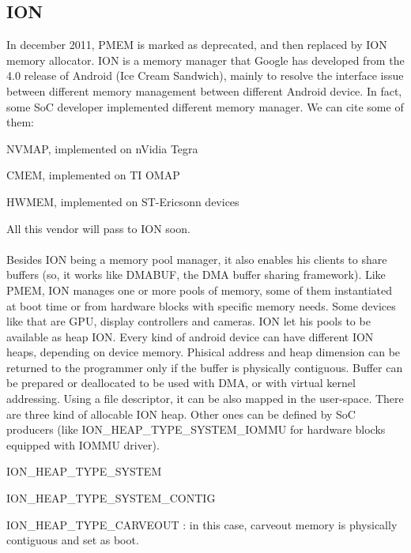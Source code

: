 \documentclass[a4paper,10pt]{article}
\begin{document}
\begin{multicols}{2}
\subsection{ION}
In december 2011, PMEM is marked as deprecated, and then replaced by ION memory 
allocator.
ION is a memory manager that Google has developed from the 4.0 release
of Android (Ice Cream Sandwich), mainly to resolve the interface issue between different
memory management between different Android device.
In fact, some SoC developer implemented different memory manager. We can cite some of
them:\\
\begin{list}{}{}
 \item NVMAP, implemented on nVidia Tegra
 \item CMEM, implemented on TI OMAP
 \item HWMEM, implemented on ST-Ericsonn devices
\end{list}
All this vendor will pass to ION soon.\\
\\
Besides ION being a memory pool manager, it also enables his clients to share buffers (so, it works like DMABUF, the
DMA buffer sharing framework).
Like PMEM, ION manages one or  more pools of memory, some of them instantiated at boot time or from hardware blocks with
specific memory needs. Some devices like that are GPU, display controllers and cameras.
ION let his pools to be available as heap ION. Every kind of android device can have different ION heaps, depending on 
device memory.
Phisical address and heap dimension can be returned to the programmer only if the buffer is physically contiguous.
Buffer can be prepared or deallocated to be used with DMA, or with virtual kernel addressing. Using a file descriptor,
it can be also mapped in the user-space.
There are three kind of allocable ION heap. Other ones can be defined by SoC producers (like ION\_HEAP\_TYPE\_SYSTEM\_IOMMU
for hardware blocks equipped with IOMMU driver).
\begin{list}{}{}
 \item ION\_HEAP\_TYPE\_SYSTEM
 \item ION\_HEAP\_TYPE\_SYSTEM\_CONTIG
 \item ION\_HEAP\_TYPE\_CARVEOUT : in this case, carveout memory is physically contiguous and set as boot.
\end{list}


\end{multicols}
\end{document}
